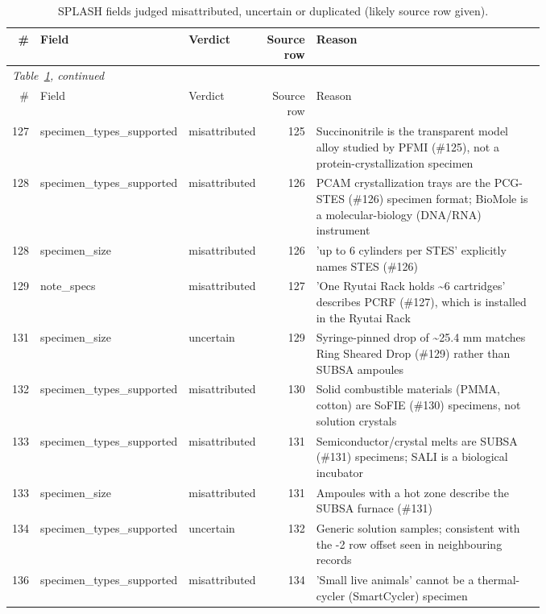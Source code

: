 \footnotesize
\begin{longtable}{r>{\raggedright\arraybackslash}p{0.2\linewidth}>{\raggedright\arraybackslash}p{0.12\linewidth}r>{\raggedright\arraybackslash}p{0.45\linewidth}}
\caption{SPLASH fields judged misattributed, uncertain or duplicated (likely source row given).}\label{tab:splash}\\
\toprule \# & Field & Verdict & Source row & Reason \\ \midrule \endfirsthead
\multicolumn{5}{l}{\emph{Table~\ref{tab:splash}, continued}}\\
\toprule \# & Field & Verdict & Source row & Reason \\ \midrule \endhead
127 & specimen\_\allowbreak{}types\_\allowbreak{}supported & misattributed & 125 & Succinonitrile is the transparent model alloy studied by PFMI (\#125), not a protein-crystallization specimen \\
128 & specimen\_\allowbreak{}types\_\allowbreak{}supported & misattributed & 126 & PCAM crystallization trays are the PCG-STES (\#126) specimen format; BioMole is a molecular-biology (DNA/RNA) instrument \\
128 & specimen\_\allowbreak{}size & misattributed & 126 & 'up to 6 cylinders per STES' explicitly names STES (\#126) \\
129 & note\_\allowbreak{}specs & misattributed & 127 & 'One Ryutai Rack holds \textasciitilde{}6 cartridges' describes PCRF (\#127), which is installed in the Ryutai Rack \\
131 & specimen\_\allowbreak{}size & uncertain & 129 & Syringe-pinned drop of \textasciitilde{}25.4 mm matches Ring Sheared Drop (\#129) rather than SUBSA ampoules \\
132 & specimen\_\allowbreak{}types\_\allowbreak{}supported & misattributed & 130 & Solid combustible materials (PMMA, cotton) are SoFIE (\#130) specimens, not solution crystals \\
133 & specimen\_\allowbreak{}types\_\allowbreak{}supported & misattributed & 131 & Semiconductor/crystal melts are SUBSA (\#131) specimens; SALI is a biological incubator \\
133 & specimen\_\allowbreak{}size & misattributed & 131 & Ampoules with a hot zone describe the SUBSA furnace (\#131) \\
134 & specimen\_\allowbreak{}types\_\allowbreak{}supported & uncertain & 132 & Generic solution samples; consistent with the -2 row offset seen in neighbouring records \\
136 & specimen\_\allowbreak{}types\_\allowbreak{}supported & misattributed & 134 & 'Small live animals' cannot be a thermal-cycler (SmartCycler) specimen \\

\end{longtable}
